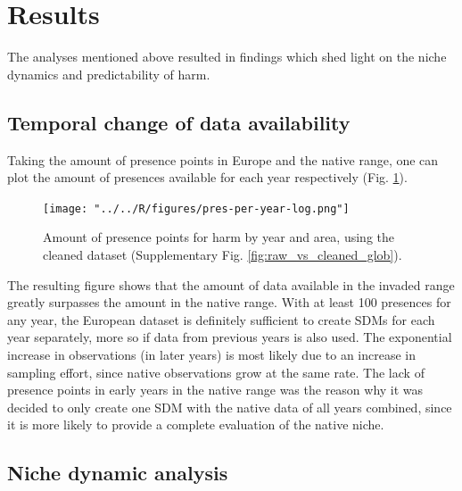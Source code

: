 \documentclass[12pt,a4paper]{article}
\begin{document}
\newpage
\section{Results} \label{sec:results}
The analyses mentioned above resulted in findings which shed light on the niche dynamics and predictability of \gls{harm}.

\subsection{Temporal change of data availability} \label{ssec:temp_data_change}
Taking the amount of presence points in Europe and the native range, one can plot the amount of presences available for each year respectively (Fig. \ref{fig:pres_per_year_log}).

\begin{figure}[!h]
    \centering
    \texttt{[image: "../../R/figures/pres-per-year-log.png"]}
    \caption{\label{fig:pres_per_year_log} Amount of presence points for \gls{harm} by year and area, using the cleaned dataset (Supplementary Fig. \ref{fig:raw_vs_cleaned_glob}).}
\end{figure}

The resulting figure shows that the amount of data available in the invaded range greatly surpasses the amount in the native range.
With at least 100 presences for any year, the European dataset is definitely sufficient to create SDMs for each year separately, more so if data from previous years is also used.
The exponential increase in observations (in later years) is most likely due to an increase in sampling effort, since native observations grow at the same rate.
The lack of presence points in early years in the native range was the reason why it was decided to only create one SDM with the native data of all years combined, since it is more likely to provide a complete evaluation of the native niche.

\subsection{Niche dynamic analysis} \label{ssec:niche_dyn_analysis}
\end{document}
